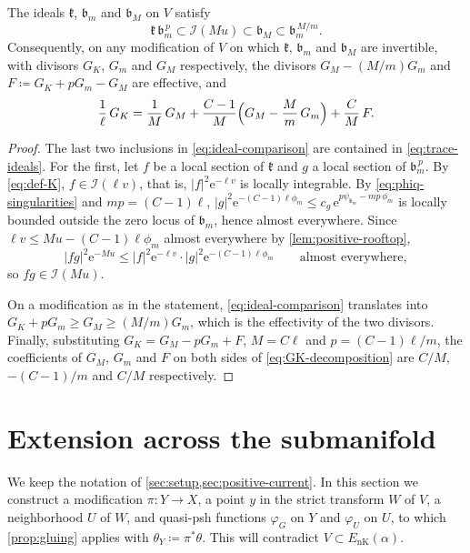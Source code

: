 \documentclass[11pt,a4paper]{amsart}
\newcommand{\EnK}{E_{\mathrm{nK}}}
\theoremstyle{definition}
\begin{document}
\begin{lemma}\label{lem:ideal-comparison}
The ideals $\mathfrak k$, $\mathfrak b_m$ and $\mathfrak b_M$ on $V$ satisfy
\begin{equation}\label{eq:ideal-comparison}
  \mathfrak k\,\mathfrak b_m^{\,p}\subset\mathcal I(Mu)\subset\mathfrak b_M
  \subset\mathfrak b_m^{\,M/m}.
\end{equation}
Consequently, on any modification of $V$ on which $\mathfrak k$,
$\mathfrak b_m$ and $\mathfrak b_M$ are invertible, with divisors $G_K$,
$G_m$ and $G_M$ respectively, the divisors $G_M-(M/m)G_m$ and
$F\coloneqq G_K+pG_m-G_M$ are effective, and
\begin{equation}\label{eq:GK-decomposition}
  \frac1\ell\,G_K=\frac1M\,G_M+\frac{C-1}M\Bigl(G_M-\frac Mm\,G_m\Bigr)
     +\frac CM\,F .
\end{equation}
\end{lemma}

\begin{proof}
The last two inclusions in \eqref{eq:ideal-comparison} are contained in
\eqref{eq:trace-ideals}. For the first, let $f$ be a local section of
$\mathfrak k$ and $g$ a local section of $\mathfrak b_m^{\,p}$. By
\eqref{eq:def-K}, $f\in\mathcal I(\ell v)$, that is,
$|f|^2\mathrm{e}^{-\ell v}$ is locally integrable. By
\eqref{eq:phiq-singularities} and $mp=(C-1)\ell$,
$|g|^2\mathrm{e}^{-(C-1)\ell\phi_m}\le c_g\,\mathrm{e}^{p\psi_{\mathfrak b_m}-mp\,\phi_m}$
is locally bounded outside the zero locus of $\mathfrak b_m$, hence almost
everywhere. Since $\ell v\le Mu-(C-1)\ell\phi_m$ almost
everywhere by \cref{lem:positive-rooftop},
\[
  |fg|^2\mathrm{e}^{-Mu}\le|f|^2\mathrm{e}^{-\ell v}\cdot
  |g|^2\mathrm{e}^{-(C-1)\ell\phi_m}
  \qquad\text{almost everywhere},
\]
so $fg\in\mathcal I(Mu)$.

On a modification as in the statement, \eqref{eq:ideal-comparison}
translates into $G_K+pG_m\ge G_M\ge(M/m)G_m$, which is the effectivity
of the two divisors. Finally, substituting $G_K=G_M-pG_m+F$,
$M=C\ell$ and $p=(C-1)\ell/m$, the coefficients of $G_M$, $G_m$ and $F$
on both sides of \eqref{eq:GK-decomposition} are $C/M$,
$-(C-1)/m$ and $C/M$ respectively.
\end{proof}

\section{Extension across the submanifold}\label{sec:extension}

We keep the notation of \cref{sec:setup,sec:positive-current}. In this
section we construct a modification $\pi\colon Y\to X$, a point $y$ in the
strict transform $W$ of $V$, a neighborhood $U$ of $W$, and quasi-psh
functions $\varphi_G$ on $Y$ and $\varphi_U$ on $U$, to which
\cref{prop:gluing} applies with $\theta_Y\coloneqq \pi^*\theta$. This will
contradict $V\subset\EnK(\alpha)$.
\end{document}
